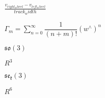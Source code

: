 \documentclass{article}
\begin{document}
$\frac{v_{right_wheel} - v_{left_wheel}}{track_width}$
\pagebreak

$ \Gamma_m = \sum_{n=0}^{\infty} \dfrac{1}{(n+m)!} (w^\wedge)^n $
\pagebreak

$\mathfrak{so(3)}$
\pagebreak

$R^3$
\pagebreak

$\mathfrak{se_k(3)}$
\pagebreak

$R^6$
\pagebreak
\end{document}
